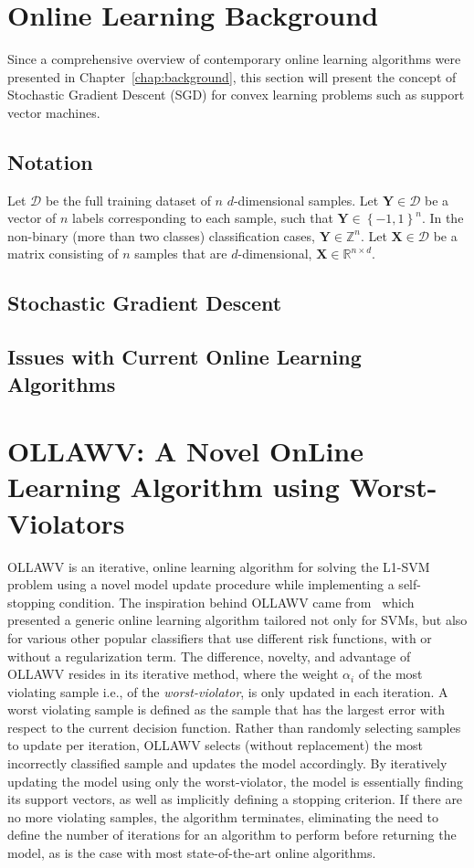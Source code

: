 \documentclass[reqno]{vcuthesis}
\newcommand{\set}[1]{{\left\{#1\right\}}}
\newcommand{\ints}{{\mathbb Z}}
\numberwithin{equation}{chapter}
\begin{document}
\section{Online Learning Background}
Since a comprehensive overview of contemporary online learning algorithms were presented in Chapter~\ref{chap:background}, this section will present the concept of Stochastic Gradient Descent (SGD) for convex learning problems such as support vector machines. 

\subsection{Notation}\label{subsec:notation}
Let $\mathcal{D}$ be the full training dataset of $n$ $d$-dimensional samples. Let $\bm{Y} \in \mathcal{D}$ be a vector of $n$ labels corresponding to each sample, such that $\bm{Y} \in \set{-1,1}^n$. In the non-binary (more than two classes) classification cases, $\bm Y \in \ints^n$. Let $\bm{X} \in \mathcal{D}$ be a matrix consisting of $n$ samples that are $d$-dimensional, $\bm{X} \in \mathbb{R}^{n \times d}$. 

\subsection{Stochastic Gradient Descent}

\subsection{Issues with Current Online Learning Algorithms}

\section{OLLAWV: A Novel OnLine Learning Algorithm using Worst-Violators}
OLLAWV is an iterative, online learning algorithm for solving the L1-SVM problem using a novel model update procedure while implementing a self-stopping condition. The inspiration behind OLLAWV came from~\cite{kecman2016fast} which presented a generic online learning algorithm tailored not only for SVMs, but also for various other popular classifiers that use different risk functions, with or without a regularization term. The difference, novelty, and advantage of OLLAWV resides in its iterative method, where the weight $\alpha_i$ of the most violating sample i.e., of the \textit{worst-violator}, is only updated in each iteration. A worst violating sample is defined as the sample that has the largest error with respect to the current decision function. Rather than randomly selecting samples to update per iteration, OLLAWV selects (without replacement) the most incorrectly classified sample and updates the model accordingly. By iteratively updating the model using only the worst-violator, the model is essentially finding its support vectors, as well as implicitly defining a stopping criterion. If there are no more violating samples, the algorithm terminates, eliminating the need to define the number of iterations for an algorithm to perform before returning the model, as is the case with most state-of-the-art online algorithms. 
\end{document}
